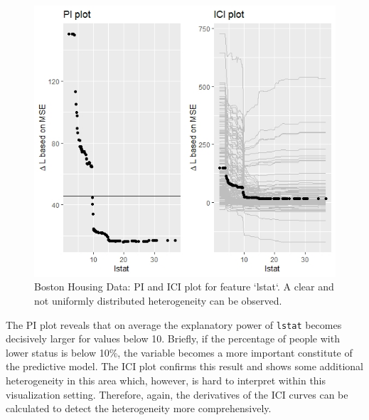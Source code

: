 \documentclass[
]{krantz}
\begin{document}
\begin{figure}

{\centering \includegraphics[width=0.99\linewidth]{images/03-7-RD1} 

}

\caption{Boston Housing Data: PI and ICI plot for feature `lstat`. A clear and not uniformly distributed heterogeneity can be observed.}\label{fig:fig9}
\end{figure}

The PI plot reveals that on average the explanatory power of \texttt{lstat} becomes decisively larger for values below 10. Briefly, if the percentage of people with lower status is below 10\%, the variable becomes a more important constitute of the predictive model. The ICI plot confirms this result and shows some additional heterogeneity in this area which, however, is hard to interpret within this visualization setting. Therefore, again, the derivatives of the ICI curves can be calculated to detect the heterogeneity more comprehensively.
\end{document}
